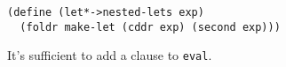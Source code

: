 \documentclass[a4paper,12pt]{article}
\begin{document}
\begin{lstlisting}
(define (let*->nested-lets exp)
  (foldr make-let (cddr exp) (second exp)))
\end{lstlisting}
It's sufficient to add a clause to \lstinline!eval!.
\end{document}
